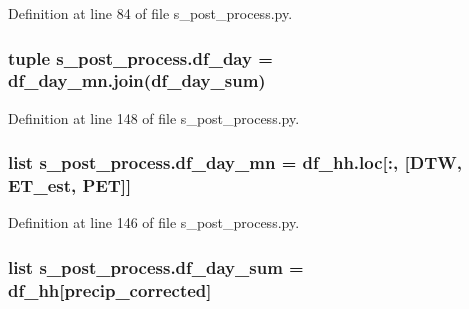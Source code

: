 Definition at line 84 of file s\+\_\+post\+\_\+process.\+py.

\hypertarget{namespaces__post__process_a97279c14527d8c47412cec3c686f0d46}{}
\subsubsection[{df\+\_\+day}]{\setlength{\rightskip}{0pt plus 5cm}tuple s\+\_\+post\+\_\+process.\+df\+\_\+day = df\+\_\+day\+\_\+mn.\+join({\bf df\+\_\+day\+\_\+sum})}\label{namespaces__post__process_a97279c14527d8c47412cec3c686f0d46}


Definition at line 148 of file s\+\_\+post\+\_\+process.\+py.

\hypertarget{namespaces__post__process_a141e240af1e17cf00558c3487a94a0e9}{}
\subsubsection[{df\+\_\+day\+\_\+mn}]{\setlength{\rightskip}{0pt plus 5cm}list s\+\_\+post\+\_\+process.\+df\+\_\+day\+\_\+mn = df\+\_\+hh.\+loc\mbox{[}\+:, \mbox{[}\textquotesingle{}D\+T\+W\textquotesingle{}, \textquotesingle{}E\+T\+\_\+est\textquotesingle{}, \textquotesingle{}P\+E\+T\textquotesingle{}\mbox{]}\mbox{]}}\label{namespaces__post__process_a141e240af1e17cf00558c3487a94a0e9}


Definition at line 146 of file s\+\_\+post\+\_\+process.\+py.

\hypertarget{namespaces__post__process_a7ccff9385178571e9d3332fde7720e82}{}
\subsubsection[{df\+\_\+day\+\_\+sum}]{\setlength{\rightskip}{0pt plus 5cm}list s\+\_\+post\+\_\+process.\+df\+\_\+day\+\_\+sum = {\bf df\+\_\+hh}\mbox{[}\textquotesingle{}precip\+\_\+corrected\textquotesingle{}\mbox{]}}\label{namespaces__post__process_a7ccff9385178571e9d3332fde7720e82}


